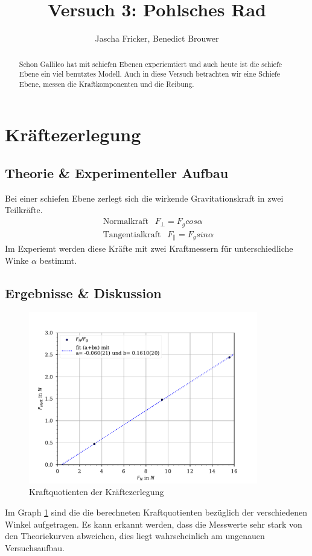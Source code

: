 \documentclass[11pt, a4paper]{article}
\title{Versuch 3: Pohlsches Rad}
\author{Jascha Fricker, Benedict Brouwer}
\begin{document}
    \maketitle

    

    \begin{abstract}
        Schon Gallileo hat mit schiefen Ebenen experiemtiert und auch heute ist die schiefe Ebene ein viel benutztes
        Modell. Auch in diese Versuch betrachten wir eine Schiefe Ebene, messen die Kraftkomponenten und
        die Reibung. 
    \end{abstract}

    \tableofcontents

    \newpage

    \section{Kräftezerlegung}
    \subsection{Theorie \& Experimenteller Aufbau}
    Bei einer schiefen Ebene zerlegt sich die wirkende Gravitationskraft in zwei Teilkräfte.
    \begin{align}
        \text{ Normalkraft } \ \ F_\perp = F_g cos \alpha \\
        \text{ Tangentialkraft } \ \ F_\parallel = F_g sin \alpha 
    \end{align}
    Im Experiemt werden diese Kräfte mit zwei Kraftmessern für unterschiedliche Winke $\alpha$ bestimmt.

    \subsection{Ergebnisse \& Diskussion}
    \begin{figure}
        \centering
        \includegraphics[width=100mm]{./5Kraftzer.pdf}

        \caption{Kraftquotienten der Kräftezerlegung}
        \label{fig:Kraftzer}
    \end{figure}
    Im Graph \ref{fig:Kraftzer} sind die die berechneten Kraftquotienten bezüglich der verschiedenen Winkel aufgetragen.
    Es kann erkannt werden, dass die Messwerte sehr stark von den Theoriekurven abweichen, dies liegt wahrscheinlich
    am ungenauen Versuchsaufbau.
    
\end{document}
